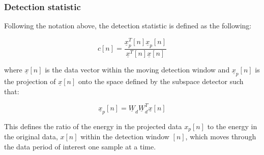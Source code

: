 \subsubsection{Detection statistic}
Following the notation above, the detection statistic is defined as the following:

\begin{equation}
c[n] = \frac{\underline{x}_{p}^{T}[n]\underline{x}_{p}[n]}{\underline{x}^{T}[n]\underline{x}[n]}
\end{equation}

where $\underline{x}[n]$ is the data vector within the moving detection window and $\underline{x}_{p}[n]$ is the projection of $\underline{x}[n]$ onto the space defined by the subspace detector such that:

\begin{equation}
\underline{x}_{p}[n] = \underline{W}_{d}\underline{W}_{d}^{T}\underline{x}[n]
\end{equation}

This defines the ratio of the energy in the projected data $x_{p}[n]$ to the energy in the original data, $x[n]$ within the detection window $[n]$, which moves through the data period of interest one sample at a time.


